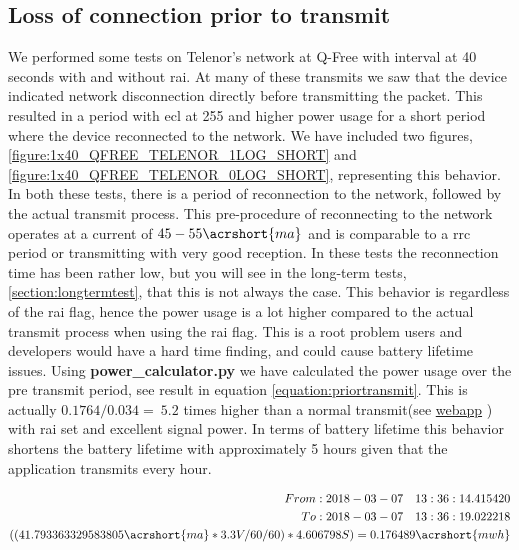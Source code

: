 \documentclass[USenglish]{ifimaster}  %
\begin{document}
\subsection{Loss of connection prior to transmit} \label{ssection:ecl_255}
We performed some tests on Telenor's network at Q-Free with interval at 40 seconds with and without \acrshort{rai}. At many of these transmits we saw that the device indicated network disconnection directly before transmitting the packet. This resulted in a period with \acrshort{ecl} at 255 and higher power usage for a short period where the device reconnected to the network. We have included two figures, \vref{figure:1x40_QFREE_TELENOR_1LOG_SHORT} and \vref{figure:1x40_QFREE_TELENOR_0LOG_SHORT}, representing this behavior. In both these tests, there is a period of reconnection to the network, followed by the actual transmit process. This pre-procedure of reconnecting to the network operates at a current of ${45-55 \acrshort{ma}}$ and is comparable to a \acrshort{rrc} period or transmitting with very good reception.
In these tests the reconnection time has been rather low, but you will see in the long-term tests, \vref{section:longtermtest}, that this is not always the case. This behavior is regardless of the \acrshort{rai} flag, hence the power usage is a lot higher compared to the actual transmit process when using the \acrshort{rai} flag. This is a root problem users and developers would have a hard time finding, and could cause battery lifetime issues. Using \textbf{power\_calculator.py} we have calculated the power usage over the pre transmit period, see result in equation \vref{equation:priortransmit}. This is actually ${0.1764 / 0.034 = ~5.2}$ times higher than a normal transmit(see \href{http://158.39.77.97:9000/\#/results/Q-FREE_TELENOR_SHORT_TEST_2018-02-28_0_0x2_5_1_100}{webapp} \cite{online:result11}) with \acrshort{rai} set and excellent signal power. In terms of battery lifetime this behavior shortens the battery lifetime with approximately 5 hours given that the application transmits every hour.

\begin{equation} \label{equation:priortransmit}
\begin{aligned}
From: 2018-03-07\quad 13:36:14.415420 \\
To: 2018-03-07\quad 13:36:19.022218 \\
((41.793363329583805\acrshort{ma} * 3.3V / 60 / 60 ) * 4.606798S) = 0.176489\acrshort{mwh} \\
\end{aligned}
\end{equation}
\end{document}

